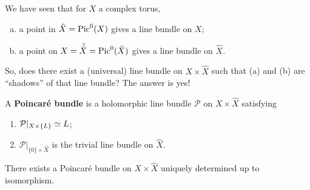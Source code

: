 We have seen that for $X$ a complex torus, 
\begin{enumerate}[(a)]
\item a point in $\hat{X}=\operatorname{Pic}^0(X)$ gives a line bundle on $X$;
\item a point on $X=\hat{\hat{X}}=\operatorname{Pic}^0(\hat{X})$ gives a line bundle on $\hat{X}$.
\end{enumerate}
So, does there exist a (universal) line bundle on $X\times \hat{X}$ such that (a) and (b) are ``shadows'' of that line bundle? The answer is yes!

A \textbf{Poincar\'{e} bundle} is a holomorphic line bundle $\mathcal{P}$ on $X\times \hat{X}$ satisfying 
\begin{enumerate}
\item $\mathcal{P}|_{X\times \{L\}}\simeq L$;
\item $\mathcal{P}|_{\{0\}\times\hat{X}}$ is the trivial line bundle on $\hat{X}$.
\end{enumerate}

\begin{theorem}
There exists a Poincar\'{e} bundle on $X\times \hat{X}$ uniquely determined up to isomorphism.
\end{theorem}

